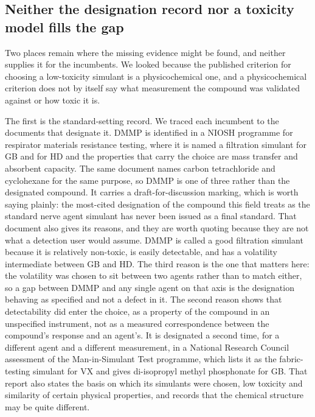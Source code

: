 \documentclass[journal=jacsat,manuscript=article,margin=1in]{achemso}
\begin{document}
\subsection{Neither the designation record nor a toxicity model fills the gap}
\label{res:docs}

Two places remain where the missing evidence might be found, and neither
supplies it for the incumbents. We looked because the published criterion for
choosing a low-toxicity simulant is a physicochemical one,\cite{webb2025}
and a physicochemical criterion does not by itself say what measurement the
compound was validated against or how toxic it is.

The first is the standard-setting record. We traced each incumbent to the
documents that designate it. DMMP is identified in a NIOSH programme for
respirator materials resistance testing, where it is named a filtration
simulant for GB and for HD and the properties that carry the choice are mass
transfer and absorbent capacity.\cite{niosh2002simulant} The same document
names carbon tetrachloride and cyclohexane for the same purpose, so DMMP is
one of three rather than the designated compound. It carries a
draft-for-discussion marking, which is worth saying plainly: the most-cited
designation of the compound this field treats as the standard nerve agent
simulant has never been issued as a final standard.
That document also gives its reasons, and they are worth quoting because they
are not what a detection user would assume. DMMP is called a good filtration
simulant because it is relatively non-toxic, is easily detectable, and has a
volatility intermediate between GB and HD. The third reason is the one that
matters here: the volatility was chosen to sit between two agents rather than
to match either, so a gap between DMMP and any single agent on that axis is
the designation behaving as specified and not a defect in it. The second
reason shows that detectability did enter the choice, as a property of the
compound in an unspecified instrument, not as a measured correspondence
between the compound's response and an agent's.
It is designated a second time, for a different agent and a different
measurement, in a National Research Council assessment of the
Man-in-Simulant Test programme, which lists it as the fabric-testing
simulant for VX and gives di-isopropyl methyl phosphonate for
GB.\cite{nrc1997mist} That report also states the basis on which its
simulants were chosen, low toxicity and similarity of certain physical
properties, and records that the chemical structure may be quite different.
\end{document}
